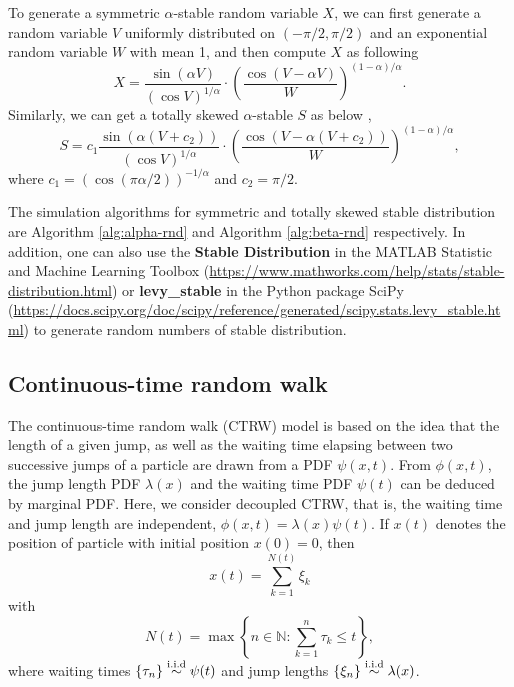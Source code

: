 \documentclass[aps, pre, preprint, amsmath, amssymb]{revtex4}
\newcommand{\N}{\mathbb{N}}
\newcommand{\xiaokuo}[1]{\left(#1\right)}
\newcommand{\dakuo}[1]{\left\{#1\right\}}
\begin{document}
To generate a symmetric $\alpha$-stable random variable $X$, we can first generate a random variable $V$ uniformly distributed on $(-\pi/2, \pi/2)$ and an exponential random variable $W$ with mean 1, and then compute $X$ as following \cite{janicki1994can, weron1995computer}
\begin{equation}\label{eq:alpha-rnd}
X = \frac{\sin{(\alpha V)}}{(\cos{V})^{1/\alpha}}
\cdot \xiaokuo{\frac{\cos{(V-\alpha V)}}{W}}^{(1-\alpha)/\alpha}.
\end{equation}
Similarly, we can get a totally skewed $\alpha$-stable $S$ as below \cite{janicki1994can, weron1995computer},
\begin{equation}\label{eq:beta-rnd}
S=c_1\frac{\sin{(\alpha(V+c_2))}}{(\cos{V})^{1/\alpha}}\cdot
\xiaokuo{\frac{\cos{(V-\alpha(V+c_2))}}{W}}^{(1-\alpha)/\alpha},
\end{equation}
where $c_1=(\cos{(\pi\alpha/2)})^{-1/\alpha}$ and $c_2=\pi/2$.

The simulation algorithms for symmetric and totally skewed stable distribution are Algorithm \ref{alg:alpha-rnd} and Algorithm \ref{alg:beta-rnd} respectively. In addition, one can also use the \textbf{Stable Distribution} in the MATLAB Statistic and Machine Learning Toolbox (\url{https://www.mathworks.com/help/stats/stable-distribution.html}) or \textbf{levy\_stable} in the Python package SciPy (\url{https://docs.scipy.org/doc/scipy/reference/generated/scipy.stats.levy_stable.html}) to generate random numbers of stable distribution.
\subsection{Continuous-time random walk}\label{sub:ctrw}
The continuous-time random walk (CTRW) model \cite{codling2008random, deng2020modeling, metzler2000random, klafter2011first} is based on the idea that the length of a given jump, as well as the waiting time elapsing between two successive jumps of a particle are drawn from a PDF $\psi(x, t)$. From $\phi(x, t)$, the jump length PDF $\lambda(x)$ and the waiting time PDF $\psi(t)$ can be deduced by marginal PDF. 
Here, we consider decoupled CTRW, that is, the waiting time and jump length are independent, $\phi(x, t)=\lambda(x)\psi(t)$.
If $x(t)$ denotes the position of particle with initial position $x(0)=0$, then 
\begin{equation}\label{eq:ctrw}
	x(t)=\sum_{k=1}^{N(t)}\xi_k
\end{equation}
with
\begin{equation}
	N(t)=\max\dakuo{n\in \N: \sum_{k=1}^n \tau_k \leqslant t},
\end{equation}
where waiting times $\dakuo{\tau_n}\overset{\textnormal{i.i.d}}{\sim} \psi(t)$ and jump lengths $\dakuo{\xi_n}\overset{\textnormal{i.i.d}}{\sim}\lambda(x)$.
\end{document}
